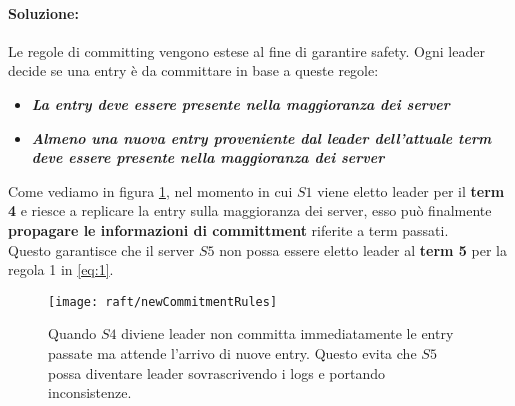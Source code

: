   \paragraph{Soluzione:}
  Le regole di committing vengono estese al fine di garantire safety. Ogni leader decide se una entry è da committare in base a queste regole:
  \begin{itemize}
    \item{\emph{\textbf{La entry deve essere presente nella maggioranza dei server}}}
    \item{\emph{\textbf{Almeno una nuova entry proveniente dal leader dell'attuale term deve essere presente nella maggioranza dei server}}}
  \end{itemize}
  Come vediamo in figura \ref{fig:figure13}, nel momento in cui $S1$ viene eletto leader per il \textbf{term 4} e riesce a replicare la entry sulla maggioranza dei server, esso può finalmente \textbf{propagare le informazioni di committment} riferite a term passati.\\
  Questo garantisce che il server $S5$ non possa essere eletto leader al \textbf{term 5} per la regola 1 in \ref{eq:1}.
  \begin{figure}[H]
    \centering
    \texttt{[image: raft/newCommitmentRules]}
    \caption[stateDiagramCaption]{Quando $S4$ diviene leader non committa immediatamente le entry passate ma attende l'arrivo di nuove entry. Questo evita che $S5$ possa diventare leader sovrascrivendo i logs e portando inconsistenze.}
    \label{fig:figure13}
  \end{figure}
